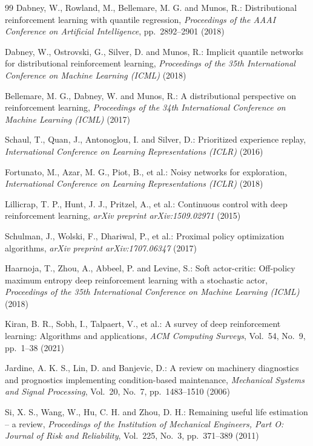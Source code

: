 \documentclass[twocolumn]{article}
\begin{document}
\begin{thebibliography}{99}
Dabney, W., Rowland, M., Bellemare, M. G. and Munos, R.:
Distributional reinforcement learning with quantile regression,
{\em Proceedings of the AAAI Conference on Artificial Intelligence}, pp.~2892--2901 (2018)

Dabney, W., Ostrovski, G., Silver, D. and Munos, R.:
Implicit quantile networks for distributional reinforcement learning,
{\em Proceedings of the 35th International Conference on Machine Learning (ICML)} (2018)

Bellemare, M. G., Dabney, W. and Munos, R.:
A distributional perspective on reinforcement learning,
{\em Proceedings of the 34th International Conference on Machine Learning (ICML)} (2017)

Schaul, T., Quan, J., Antonoglou, I. and Silver, D.:
Prioritized experience replay,
{\em International Conference on Learning Representations (ICLR)} (2016)

Fortunato, M., Azar, M. G., Piot, B., et al.:
Noisy networks for exploration,
{\em International Conference on Learning Representations (ICLR)} (2018)

Lillicrap, T. P., Hunt, J. J., Pritzel, A., et al.:
Continuous control with deep reinforcement learning,
{\em arXiv preprint arXiv:1509.02971} (2015)

Schulman, J., Wolski, F., Dhariwal, P., et al.:
Proximal policy optimization algorithms,
{\em arXiv preprint arXiv:1707.06347} (2017)

Haarnoja, T., Zhou, A., Abbeel, P. and Levine, S.:
Soft actor-critic: Off-policy maximum entropy deep reinforcement learning with a stochastic actor,
{\em Proceedings of the 35th International Conference on Machine Learning (ICML)} (2018)

Kiran, B. R., Sobh, I., Talpaert, V., et al.:
A survey of deep reinforcement learning: Algorithms and applications,
{\em ACM Computing Surveys}, Vol.~54, No.~9, pp.~1--38 (2021)

Jardine, A. K. S., Lin, D. and Banjevic, D.:
A review on machinery diagnostics and prognostics implementing condition-based maintenance,
{\em Mechanical Systems and Signal Processing}, Vol.~20, No.~7, pp.~1483--1510 (2006)

Si, X. S., Wang, W., Hu, C. H. and Zhou, D. H.:
Remaining useful life estimation -- a review,
{\em Proceedings of the Institution of Mechanical Engineers, Part O: Journal of Risk and Reliability}, Vol.~225, No.~3, pp.~371--389 (2011)


\end{thebibliography}
\end{document}
